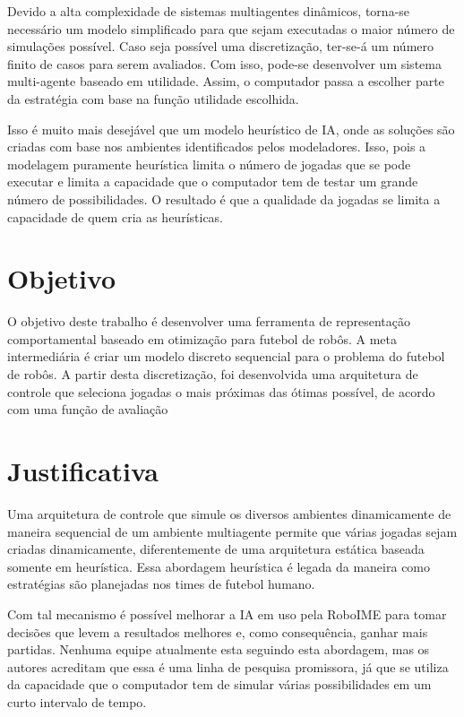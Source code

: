 Devido a alta complexidade de sistemas multiagentes dinâmicos, torna-se
necessário um modelo simplificado para que sejam executadas o maior número de
simulações possível.  Caso seja possível uma discretização, ter-se-á um número
finito de casos para serem avaliados. Com isso, pode-se desenvolver um sistema
multi-agente baseado em utilidade. Assim, o computador passa a escolher parte
da estratégia com base na função utilidade escolhida.

Isso é muito mais desejável que um modelo heurístico de IA, onde as soluções são
criadas com base nos ambientes identificados pelos modeladores. Isso, pois a
modelagem puramente heurística limita o número de jogadas que se pode executar e
limita a capacidade que o computador tem de testar um grande número de possibilidades.
O resultado é que a qualidade da jogadas se limita a capacidade de quem cria as
heurísticas.

\section{Objetivo}

O objetivo deste trabalho é desenvolver uma ferramenta de representação
comportamental baseado em otimização para futebol de robôs.
A meta intermediária é criar um modelo discreto sequencial
para o problema do futebol de robôs. A partir desta
discretização, foi desenvolvida uma arquitetura de controle
que seleciona jogadas o mais próximas das ótimas possível,
de acordo com uma função de avaliação

\section{Justificativa}

Uma arquitetura de controle que simule os diversos ambientes dinamicamente de
maneira sequencial de um ambiente multiagente permite que várias jogadas sejam
criadas dinamicamente, diferentemente de uma arquitetura estática baseada somente
em heurística. Essa abordagem heurística é legada da maneira como estratégias
são planejadas nos times de futebol humano.

Com tal mecanismo é possível melhorar a IA em uso pela RoboIME para tomar
decisões que levem a resultados melhores e, como consequência, ganhar mais
partidas. Nenhuma equipe atualmente esta seguindo esta abordagem, mas os autores
acreditam que essa é uma linha de pesquisa promissora, já que se utiliza da
capacidade que o computador tem de simular várias possibilidades em um curto
intervalo de tempo.

